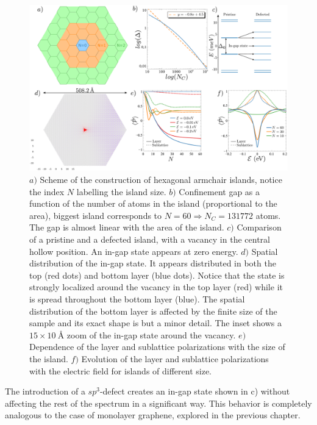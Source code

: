 \begin{figure}[!ht!]
\centering
\includegraphics[width=\textwidth]{artlat/fig/confinement.pdf}
\vspace{-20pt}
\caption{$a)$ Scheme of the construction of hexagonal armchair islands, notice the index $N$ labelling the island size. $b)$ Confinement gap as a function of the number of atoms in the island (proportional to the area), biggest island corresponds to $N=60\Rightarrow N_C=131772$ atoms. The gap is almost linear with the area of the island. $c)$ Comparison of a pristine and a defected island, with a vacancy in the central hollow position. An in-gap state appears at zero energy. $d)$ Spatial distribution of the in-gap state. It appears distributed in both the top (red dots) and bottom layer (blue dots). Notice that the state is strongly localized around the vacancy in the top layer (red) while it is spread throughout the bottom layer (blue). The spatial distribution of the bottom layer is affected by the finite size of the sample and its exact shape is but a minor detail. The inset shows a $15\times\SI{10}{\angstrom}$ zoom of the in-gap state around the vacancy. $e)$ Dependence of the layer and sublattice polarizations with the size of the island. $f)$ Evolution of the layer and sublattice polarizations with the electric field for islands of different size.}
\label{confinement}
\end{figure}
\smallskip


The introduction of a $sp^3$-defect creates an in-gap state shown in c) without affecting the rest of the spectrum in a significant way. This behavior is completely analogous to the case of monolayer graphene, explored in the previous chapter.


